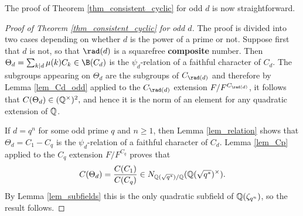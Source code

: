 The proof of Theorem \ref{thm_consistent_cyclic} for odd $d$ is now straightforward.

\begin{proof}[Proof of Theorem \ref{thm_consistent_cyclic} for odd $d$]
    The proof is divided into two cases depending on whether $d$ is the power of a prime or not. Suppose first that $d$ is not, so that $\rad(d)$ is a squarefree \textbf{composite} number. Then $\Theta_d=\sum_{k\mid d}\mu(k)C_k\in \B(C_d)$ is the $\psi_d$-relation of a faithful character of $C_d$. The subgroups appearing on $\Theta_d$ are the subgroups of $C_{\rad(d)}$ and therefore by Lemma \ref{lem_Cd_odd} applied to the $C_{\rad(d)}$ extension $F/F^{C_{\rad(d)}}$, it follows that 
    $C(\Theta_d)\in(\mathbb{Q}^{\times})^2,$ and hence it is the norm of an element for any quadratic extension of $\mathbb{Q}$. 

    If $d=q^n$ for some odd prime $q$ and $n\geq1$, then Lemma \ref{lem_relation} shows that $\Theta_d=C_1-C_q$ is the $\psi_d$-relation of a faithful character of $C_d$. Lemma \ref{lem_Cp} applied to the $C_q$ extension $F/F^{C_q}$ proves that 
    $$C(\Theta_d)=\frac{C(C_1)}{C(C_q)}\in N_{\mathbb{Q}(\sqrt{q^*})/\mathbb{Q}}(\mathbb{Q}(\sqrt{q^*})^{\times}).$$ 
    By Lemma \ref{lem_subfields} this is the only quadratic subfield of $\mathbb{Q}(\zeta_{q^n})$, so the result follows.
\end{proof}
